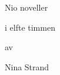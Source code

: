
\startalignment[center]

\blank[40pt,force]

{\tfd{}\WORD Nio noveller}


{\tfd{}\WORD i elfte timmen}

\blank[45pt]

{\itc av}

\blank[40pt]

{\itd Nina Strand}

\stopalignment
